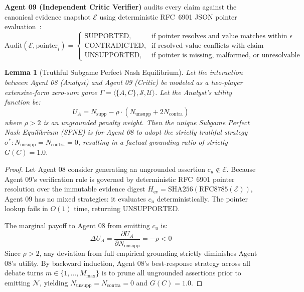 \documentclass{ieeeaccess}
\newtheorem{lemma}{Lemma}
\begin{document}
\textbf{Agent 09 (Independent Critic Verifier)} audits every claim against the canonical evidence snapshot $\mathcal{E}$ using deterministic RFC~6901 JSON pointer evaluation~\cite{rfc6901}:
\begin{equation}
\text{Audit}(\mathcal{E}, \text{pointer}_i) = \begin{cases}
\text{SUPPORTED}, & \text{if pointer resolves and value matches within } \epsilon \\
\text{CONTRADICTED}, & \text{if resolved value conflicts with claim} \\
\text{UNSUPPORTED}, & \text{if pointer is missing, malformed, or unresolvable}
\end{cases}
\end{equation}

\begin{lemma}[Truthful Subgame Perfect Nash Equilibrium]
\label{lem:nash_equilibrium}
Let the interaction between Agent 08 (Analyst) and Agent 09 (Critic) be modeled as a two-player extensive-form zero-sum game $\Gamma = \langle \{A, C\}, \mathcal{S}, \mathcal{U} \rangle$. Let the Analyst's utility function be:
\begin{equation}
U_A = N_{\text{supp}} - \rho \cdot \left( N_{\text{unsupp}} + 2 N_{\text{contra}} \right)
\end{equation}
where $\rho > 2$ is an ungrounded penalty weight. Then the unique Subgame Perfect Nash Equilibrium (SPNE) is for Agent 08 to adopt the strictly truthful strategy $\sigma^* : N_{\text{unsupp}} = N_{\text{contra}} = 0$, resulting in a factual grounding ratio of strictly $G(C) = 1.0$.
\end{lemma}

\begin{proof}
Let Agent 08 consider generating an ungrounded assertion $c_u \notin \mathcal{E}$. Because Agent 09's verification rule is governed by deterministic RFC~6901 pointer resolution over the immutable evidence digest $H_{\text{ev}} = \text{SHA256}(\text{RFC8785}(\mathcal{E}))$, Agent 09 has no mixed strategies: it evaluates $c_u$ deterministically. The pointer lookup fails in $O(1)$ time, returning $\text{UNSUPPORTED}$. 

The marginal payoff to Agent 08 from emitting $c_u$ is:
\begin{equation}
\Delta U_A = \frac{\partial U_A}{\partial N_{\text{unsupp}}} = -\rho < 0
\end{equation}
Since $\rho > 2$, any deviation from full empirical grounding strictly diminishes Agent 08's utility. By backward induction, Agent 08's best-response strategy across all debate turns $m \in \{1, \dots, M_{\max}\}$ is to prune all ungrounded assertions prior to emitting $\mathcal{N}$, yielding $N_{\text{unsupp}} = N_{\text{contra}} = 0$ and $G(C) = 1.0$.
\end{proof}
\end{document}
